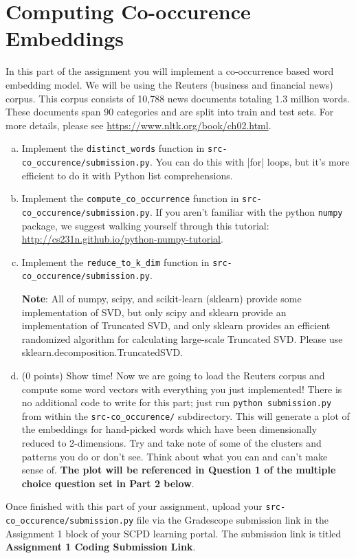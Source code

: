 \section{Computing Co-occurence Embeddings}
In this part of the assignment you will implement a co-occurrence based word embedding model. We will be using the Reuters (business and financial news) corpus. This corpus consists of 10,788 news documents totaling 1.3 million words. These documents span 90 categories and are split into train and test sets. For more details, please see \url{https://www.nltk.org/book/ch02.html}. \newline

\begin{enumerate}[(a)]
    \item {} Implement the \texttt{distinct\_words} function in \texttt{src-co\_occurence/submission.py}. You can do this with |for| loops, but it's more efficient to do it with Python list comprehensions.
    
    \item {} Implement the \texttt{compute\_co\_occurrence} function in \texttt{src-co\_occurence/submission.py}. If you aren't familiar with the python \texttt{numpy} package, we suggest walking yourself through this tutorial: \url{http://cs231n.github.io/python-numpy-tutorial}. 
    
    \item {} Implement the \texttt{reduce\_to\_k\_dim} function in \texttt{src-co\_occurence/submission.py}. \newline
    
    \textbf{Note}: All of numpy, scipy, and scikit-learn (sklearn) provide some implementation of SVD, but only scipy and sklearn provide an implementation of Truncated SVD, and only sklearn provides an efficient randomized algorithm for calculating large-scale Truncated SVD. Please use sklearn.decomposition.TruncatedSVD.
    
    \item (0 points) Show time! Now we are going to load the Reuters corpus and compute some word vectors with everything you just implemented! There is no additional code to write for this part; just run \texttt{python submission.py} from within the \texttt{src-co\_occurence/} subdirectory. This will generate a plot of the embeddings for hand-picked words which have been dimensionally reduced to 2-dimensions. Try and take note of some of the clusters and patterns you do or don't see. Think about what you can and can't make sense of. \textbf{The plot will be referenced in Question 1 of the multiple choice question set in Part 2 below}. 
\end{enumerate}

Once finished with this part of your assignment, upload your \texttt{src-co\_occurence/submission.py} file via the Gradescope submission link in the Assignment 1 block of your SCPD learning portal. The submission link is titled \textbf{Assignment 1 Coding Submission Link}.